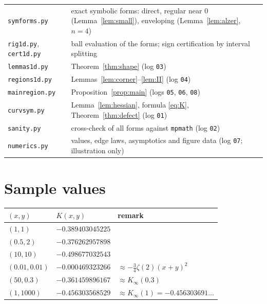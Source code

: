 \documentclass[11pt,a4paper]{article}
\theoremstyle{definition}
\theoremstyle{remark}
\begin{document}
\smallskip
\begin{tabular}{@{}p{}p{}@{}}
\texttt{symforms.py} & exact symbolic forms: direct, regular near $0$ (Lemma~\ref{lem:small}), enveloping (Lemma~\ref{lem:alzer}, $n=4$)\\
\texttt{rig1d.py}, \texttt{cert1d.py} & ball evaluation of the forms; sign certification by interval splitting\\
\texttt{lemmas1d.py} & Theorem~\ref{thm:shape} (log \texttt{03})\\
\texttt{regions1d.py} & Lemmas~\ref{lem:corner}--\ref{lem:II} (log \texttt{04})\\
\texttt{mainregion.py} & Proposition~\ref{prop:main} (logs \texttt{05}, \texttt{06}, \texttt{08})\\
\texttt{curvsym.py} & Lemma~\ref{lem:hessian}, formula \eqref{eq:K}, Theorem~\ref{thm:defect} (log \texttt{01})\\
\texttt{sanity.py} & cross-check of all forms against \texttt{mpmath} (log \texttt{02})\\
\texttt{numerics.py} & values, edge laws, asymptotics and figure data (log \texttt{07}; illustration only)
\end{tabular}

\section{Sample values}\label{app:values}
\begin{center}
\begin{tabular}{lll}
\toprule
$(x,y)$ & $K(x,y)$ & remark\\
\midrule
$(1,1)$ & $-0.389403045225$ & \\
$(0.5,2)$ & $-0.376262957898$ & \\
$(10,10)$ & $-0.498677032543$ & \\
$(0.01,0.01)$ & $-0.000469323266$ & $\approx-\frac34\zeta(2)(x+y)^2$\\
$(50,0.3)$ & $-0.361459896167$ & $\approx K_\infty(0.3)$\\
$(1,1000)$ & $-0.456303568529$ & $\approx K_\infty(1)=-0.456303691\ldots$\\
\bottomrule
\end{tabular}
\end{center}
\end{document}
